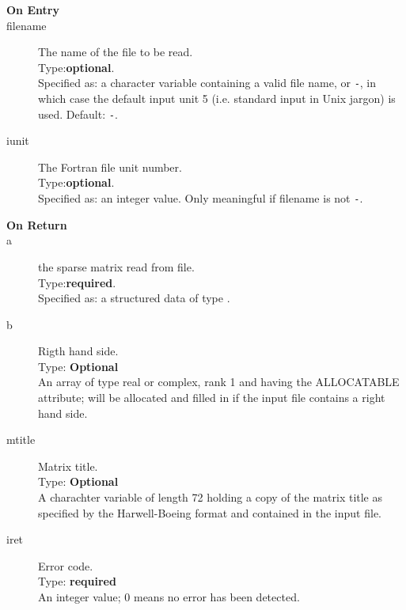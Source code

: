 
 
\begin{description}
\item[\bf  On Entry ]
\item[filename] The name of the file to be read.\\
Type:{\bf optional}.\\
Specified as: a character variable containing a valid file name, or
\verb|-|, in which case the default input unit  5 (i.e. standard input
in Unix jargon) is used. Default: \verb|-|. 
\item[iunit] The Fortran file unit number.\\
Type:{\bf optional}.\\
Specified as: an integer value. Only meaningful if filename is not \verb|-|.
\end{description}

\begin{description}
\item[\bf On Return]
\item[a] the sparse matrix read from file.\\
Type:{\bf required}.\\
Specified as: a structured data of type \spdata.
\item[b] Rigth hand side.\\
Type: {\bf Optional} \\
An  array of type real or complex, rank 1 and having the ALLOCATABLE
attribute; will be allocated and filled in if the input file contains
a right hand side. 
\item[mtitle] Matrix title.\\
Type: {\bf Optional} \\
A charachter variable of length 72 holding a copy of the
matrix title as specified by the Harwell-Boeing format and contained
in the input file.
\item[iret] Error code.\\
Type: {\bf required} \\
An integer value; 0 means no error has been detected. 
\end{description}






